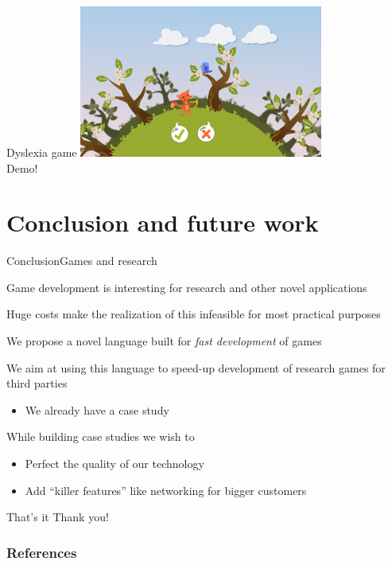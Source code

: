 \documentclass{beamer}
\begin{document}
\begin{frame}{Dyslexia game}
\center
\includegraphics[height=5cm]{Pics/dyslexia_game.png}
\\ Demo!
\end{frame}


\section{Conclusion and future work}
\begin{slide}{Conclusion}{Games and research}{
\item Game development is interesting for research and other novel applications
\item Huge costs make the realization of this infeasible for most practical purposes
\item We propose a novel language built for \textit{fast development} of games
\pause
\item We aim at using this language to speed-up development of research games for third parties
\begin{itemize}
\item We already have a case study
\end{itemize}
\item While building case studies we wish to
\begin{itemize}
\item Perfect the quality of our technology
\item Add ``killer features'' like networking for bigger customers
\end{itemize}
}\end{slide}


\begin{frame}{That's it}
\center
\fontsize{18pt}{7.2}\selectfont
Thank you!
\end{frame}

\begin{frame}[allowframebreaks]
\frametitle{References}


\end{frame}
\end{document}
